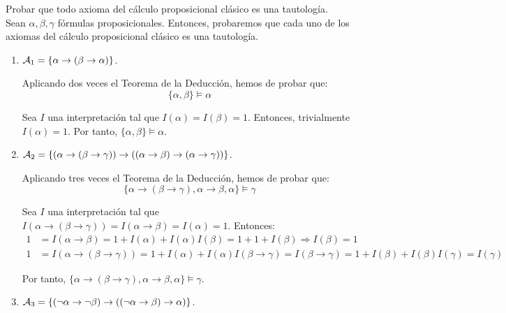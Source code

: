 \begin{ejercicio}\label{ej:1.5}
    Probar que todo axioma del cálculo proposicional clásico es una tautología.\\

    Sean $\alpha,\beta,\gamma$ fórmulas proposicionales. Entonces, probaremos que cada uno de los axiomas del cálculo proposicional clásico es una tautología.
    \begin{enumerate}
        \item $\mathcal{A}_1 = \{\alpha\rightarrow(\beta\rightarrow\alpha)\}$.
        
        Aplicando dos veces el Teorema de la Deducción, hemos de probar que:
        \begin{equation*}
            \{\alpha,\beta\} \models \alpha
        \end{equation*}

        Sea $I$ una interpretación tal que $I(\alpha) = I(\beta) = 1$. Entonces, trivialmente $I(\alpha) = 1$. Por tanto, $\{\alpha,\beta\} \models \alpha$.
        \item $\mathcal{A}_2 = \{(\alpha\rightarrow(\beta\rightarrow\gamma))\rightarrow((\alpha\rightarrow\beta)\rightarrow(\alpha\rightarrow\gamma))\}$.
        
        Aplicando tres veces el Teorema de la Deducción, hemos de probar que:
        \begin{equation*}
            \{\alpha\rightarrow(\beta\rightarrow\gamma),\alpha\rightarrow\beta,\alpha\} \models \gamma
        \end{equation*}

        Sea $I$ una interpretación tal que $I\left(\alpha\rightarrow(\beta\rightarrow\gamma)\right) = I\left(\alpha\rightarrow\beta\right) = I(\alpha) = 1$. Entonces:
        \begin{align*}
            1&= I(\alpha\rightarrow\beta) = 1+I(\alpha)+I(\alpha)I(\beta)=1+1+I(\beta)\Longrightarrow I(\beta)=1\\
            1&=I\left(\alpha\rightarrow(\beta\rightarrow\gamma)\right) = 1+I(\alpha)+I(\alpha)I(\beta\rightarrow\gamma) = I(\beta\rightarrow\gamma)
            = 1+I(\beta)+I(\beta)I(\gamma) = I(\gamma)
        \end{align*}

        Por tanto, $\{\alpha\rightarrow(\beta\rightarrow\gamma),\alpha\rightarrow\beta,\alpha\} \models \gamma$.
        \item $\mathcal{A}_3 = \{(\neg\alpha\rightarrow\neg\beta)\rightarrow\left((\neg\alpha\rightarrow\beta)\rightarrow\alpha\right)\}$.
        

\end{enumerate}
\end{ejercicio}

